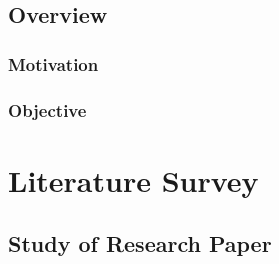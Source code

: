 \documentclass[a4paper, oneside, 12pt]{book}
\begin{document}
		\subsection{Overview}
			\subsubsection{Motivation}
			\subsubsection{Objective}
	\newpage
	\section{Literature Survey}
	\newpage
		\subsection{Study of Research Paper}
\end{document}
